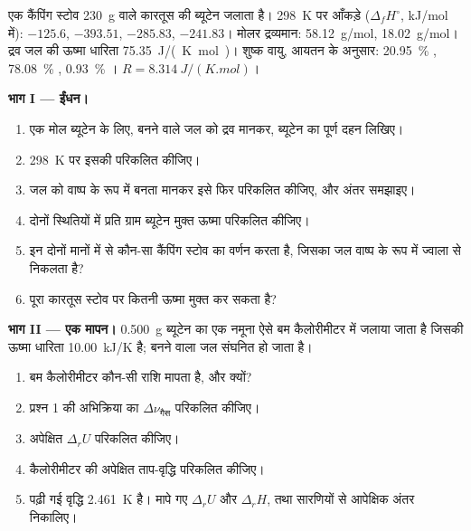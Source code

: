 \begin{problem}[{सप्ताहांत समस्या --- ब्यूटेन की ऊर्जा, बम कैलोरीमीटर में
एक मापन, बर्तन में गर्म किया गया पानी, और ज्वाला का
ताप}]
\label{pb:b2:reaction-enthalpy:1}
एक कैंपिंग स्टोव \qty{230}{g} वाले कारतूस की ब्यूटेन जलाता है।
\qty{298}{K} पर आँकड़े ($\Delta_f H^\circ$, \unit{kJ/mol} में): 
$-125.6$,  $-393.51$,  $-285.83$, 
$-241.83$। मोलर द्रव्यमान:  \qty{58.12}{g/mol}, 
\qty{18.02}{g/mol}। द्रव जल की ऊष्मा धारिता
\qty{75.35}{J/(K.mol)}। शुष्क वायु, आयतन के अनुसार: \qty{20.95}{\percent} ,
\qty{78.08}{\percent} , \qty{0.93}{\percent} । $R = \qty{8.314}{J/(K.mol)}$।

\medskip
\noindent\textbf{भाग I --- ईंधन।}
\begin{enumerate}
  \item एक मोल ब्यूटेन के लिए, बनने वाले जल को द्रव मानकर, ब्यूटेन का
        पूर्ण दहन लिखिए।
  \item \qty{298}{K} पर इसकी  परिकलित कीजिए।
  \item जल को वाष्प के रूप में बनता मानकर इसे फिर परिकलित कीजिए, और
        अंतर समझाइए।
  \item दोनों स्थितियों में प्रति ग्राम ब्यूटेन मुक्त ऊष्मा परिकलित कीजिए।
  \item इन दोनों मानों में से कौन-सा कैंपिंग स्टोव का वर्णन करता है, जिसका जल
        वाष्प के रूप में ज्वाला से निकलता है?
  \item पूरा कारतूस स्टोव पर कितनी ऊष्मा मुक्त कर सकता है?
\end{enumerate}

\medskip
\noindent\textbf{भाग II --- एक मापन।}
\qty{0.500}{g} ब्यूटेन का एक नमूना ऐसे बम कैलोरीमीटर में जलाया जाता है जिसकी
ऊष्मा धारिता \qty{10.00}{kJ/K} है; बनने वाला जल संघनित हो जाता है।
\begin{enumerate}[resume]
  \item बम कैलोरीमीटर कौन-सी राशि मापता है, और क्यों?
  \item प्रश्न 1 की अभिक्रिया का $\Delta\nu_{\text{गैस}}$ परिकलित कीजिए।
  \item अपेक्षित $\Delta_r U$ परिकलित कीजिए।
  \item कैलोरीमीटर की अपेक्षित ताप-वृद्धि परिकलित कीजिए।
  \item पढ़ी गई वृद्धि \qty{2.461}{K} है। मापे गए $\Delta_r U$
        और $\Delta_r H$, तथा सारणियों से आपेक्षिक अंतर निकालिए।
\end{enumerate}


\end{problem}

